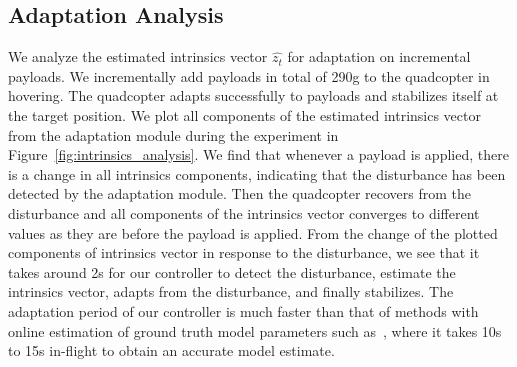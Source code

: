 

\subsection{Adaptation Analysis}
We analyze the estimated intrinsics vector $\hat{z_t}$ for adaptation on incremental payloads. We incrementally add payloads in total of 290g to the quadcopter in hovering. The quadcopter adapts successfully to payloads and stabilizes itself at the target position. 
%
We plot all components of the estimated intrinsics vector from the adaptation module during the experiment in Figure~\ref{fig:intrinsics_analysis}. 
%
We find that whenever a payload is applied, there is a change in all intrinsics components, indicating that the disturbance has been detected by the adaptation module. 
%
Then the quadcopter recovers from the disturbance and all components of the intrinsics vector converges to different values as they are before the payload is applied. 
%
From the change of the plotted components of intrinsics vector in response to the disturbance, we see that it takes around 2s for our controller to detect the disturbance, estimate the intrinsics vector, adapts from the disturbance, and finally stabilizes. 
%
The adaptation period of our controller is much faster than that of methods with online estimation of ground truth model parameters such as~\cite{wuest2019online}, where it takes 10s to 15s in-flight to obtain an accurate model estimate.

